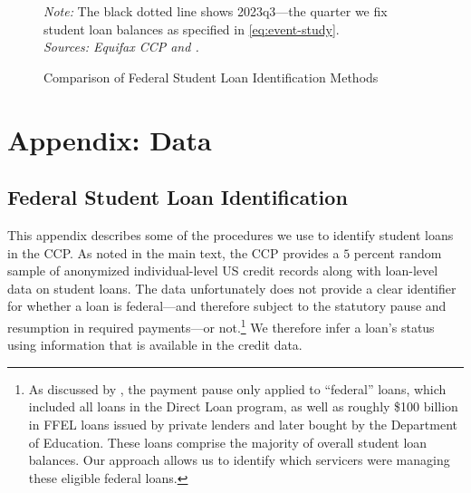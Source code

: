 \documentclass[12pt]{article}
\begin{document}
\begin{figure}[!ht]
    \centering
    \caption{Comparison of Federal Student Loan Identification Methods}
    \resizebox{\linewidth}{!}
    {
    
    }
    \label{fig:appendix_sl_comparison}

    \raggedright     \footnotesize{
    \emph{Note:} The black dotted line shows 2023q3---the quarter we fix student loan balances as specified in \cref{eq:event-study}.
	} \\
	\textit{Sources: Equifax CCP and \citet{DeptOfEducationPortfolioSummary}.}
\end{figure}

\clearpage

\section{Appendix: Data}

\subsection{Federal Student Loan Identification}
\label{sec:data_appendix_ccp}

This appendix describes some of the procedures we use to identify student loans in the CCP.  As noted in the main text, the CCP provides a $5$ percent random sample of anonymized individual-level US credit records along with loan-level data on student loans.  The data unfortunately does not provide a clear identifier for whether a loan is federal---and therefore subject to the statutory pause and resumption in required payments---or not.\footnote{As discussed by \cite{dinerstein2024debt}, the payment pause only applied to ``federal'' loans, which included all loans in the Direct Loan program, as well as roughly \$100 billion in FFEL loans issued by private lenders and later bought by the Department of Education. These loans comprise the majority of overall student loan balances. Our approach allows us to identify which servicers were managing these eligible federal loans.}   We therefore infer a loan's status using information that is available in the credit data.
\end{document}
